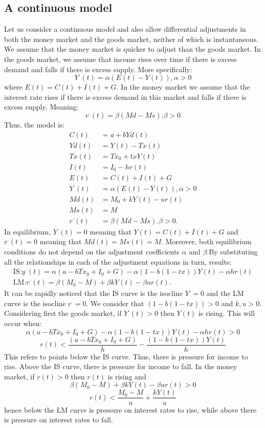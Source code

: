 \documentclass[a4paper,11pt]{report}
\begin{document}
\subsection{A continuous model}
Let us consider a continuous model and also allow differential adjustments in both the money market and the goods market, neither of which is instantaneous. We assume that the money market is quicker to adjust than the goods market. In the goods market, we assume that income rises over time if there is excess demand and falls if there is excess supply. More specifically:
\begin{equation}
 Y^{\cdot}(t)=\alpha(E(t)-Y(t)), \alpha>0
\end{equation}
where $E(t)=C(t)+I(t)+G$. In the money market we assume that the interest rate rises if there is excess demand in this market and falls if there is excess supply. Meaning:
\begin{equation}
 r^{\cdot}(t)=\beta(Md-Ms).\beta>0
\end{equation}
Thus, the model is:
\begin{align}
 C(t)&=a+bYd(t) \\
 Yd(t)&=Y(t)-Tx(t) \\
 Tx(t)&=Tx_{0}+txY(t)\\
 I(t)&=I_{0}-hr(t)\\
 E(t)&=C(t)+I(t)+G\\
 Y^{\cdot}(t)&=\alpha(E(t)-Y(t)), \alpha>0\\
 Md(t)&=M_{0}+kY(t)-ur(t)\\
 Ms(t)&=M\\
 r^{\cdot}(t)&=\beta(Md-Ms).\beta>0.
\end{align}
In equilibrium, $Y^{\cdot}(t)=0$ meaning that $Y(t)=C(t)+I(t)+G$ and $r^{\cdot}(t)=0$ meaning that $Md(t)=Ms(t)=M$. Moreover, both equilibrium conditions do not depend on the adjustment coefficients $\alpha$ and $\beta$.By substituting all the relationships in each of the adjustment equations in turn, results:
\begin{align*}
 \text{IS:}y^{\cdot}(t)=\alpha(a-bTx_{0}+I_{0}+G)-\alpha(1-b(1-tx))Y(t)-\alpha hr(t) \\
 \text{LM:} r^{\cdot}(t)=\beta(M_{0}-M)+\beta k Y(t)-\beta ur(t).
\end{align*}
It can be rapidly noticed that the IS curve is the isocline $Y^{\cdot}=0$ and the LM curve is the isocline $r^{\cdot}=0$. We consider that $(1-b(1-tx))>0$ and $k,u>0$.
Considering first the goods market, if $Y^{\cdot}(t)>0$ then $Y(t)$ is rising. This will occur when:
$$\alpha(a-bTx_{0}+I_{0}+G)-\alpha(1-b(1-tx))Y(t)-\alpha hr(t)>0$$
$$r(t)<\frac{(a-bTx_{0}+I_{0}+G)}{h}-\frac{(1-b(1-tx))Y(t)}{h}$$
This refers to points below the IS curve. Thus, there is pressure for income to rise. Above the IS curve, there is pressure for income to fall.
In the money market, if $r(t)>0$ then $r(t)$ is rising and
$$\beta(M_{0}-M)+\beta kY(t)-\beta ur(t)>0$$
$$r(t)<\frac{M_{0}-M}{u}+\frac{kY(t)}{u}$$
hence below the LM curve is pressure on interest rates to rise, while above there is pressure on interest rates to fall. 
\end{document}
